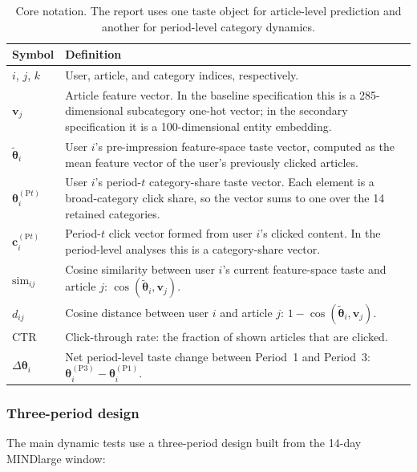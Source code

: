 \documentclass[11pt]{article}
\begin{document}
\begin{table}[ht]
\centering
\caption{Core notation. The report uses one taste object for article-level prediction and another for period-level category dynamics.}
\label{tab:notation}
\begin{tabularx}{\textwidth}{>{\raggedright\arraybackslash}p{}Y}
\toprule
Symbol & Definition \\
\midrule
$i$, $j$, $k$ & User, article, and category indices, respectively. \\
$\mathbf{v}_j$ & Article feature vector. In the baseline specification this is a 285-dimensional subcategory one-hot vector; in the secondary specification it is a 100-dimensional entity embedding. \\
$\tilde{\boldsymbol{\theta}}_i$ & User $i$'s pre-impression feature-space taste vector, computed as the mean feature vector of the user's previously clicked articles. \\
$\boldsymbol{\theta}_i^{(\mathrm{P}t)}$ & User $i$'s period-$t$ category-share taste vector. Each element is a broad-category click share, so the vector sums to one over the 14 retained categories. \\
$\mathbf{c}_i^{(\mathrm{P}t)}$ & Period-$t$ click vector formed from user $i$'s clicked content. In the period-level analyses this is a category-share vector. \\
$\text{sim}_{ij}$ & Cosine similarity between user $i$'s current feature-space taste and article $j$: $\cos(\tilde{\boldsymbol{\theta}}_i,\mathbf{v}_j)$. \\
$d_{ij}$ & Cosine distance between user $i$ and article $j$: $1-\cos(\tilde{\boldsymbol{\theta}}_i,\mathbf{v}_j)$. \\
CTR & Click-through rate: the fraction of shown articles that are clicked. \\
$\Delta\boldsymbol{\theta}_i$ & Net period-level taste change between Period~1 and Period~3: $\boldsymbol{\theta}_i^{(\mathrm{P3})} - \boldsymbol{\theta}_i^{(\mathrm{P1})}$. \\
\bottomrule
\end{tabularx}
\end{table}
\FloatBarrier

\subsubsection{Three-period design}
\label{sec:three_period_design}

The main dynamic tests use a three-period design built from the 14-day MINDlarge window:
\end{document}
